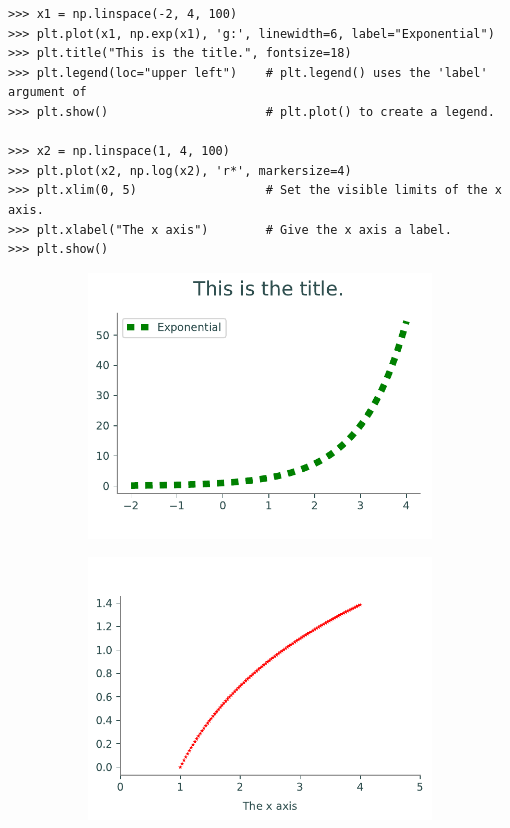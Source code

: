 \begin{lstlisting}
>>> x1 = np.linspace(-2, 4, 100)
>>> plt.plot(x1, np.exp(x1), 'g:', linewidth=6, label="Exponential")
>>> plt.title("This is the title.", fontsize=18)
>>> plt.legend(loc="upper left")    # plt.legend() uses the 'label' argument of
>>> plt.show()                      # plt.plot() to create a legend.

>>> x2 = np.linspace(1, 4, 100)
>>> plt.plot(x2, np.log(x2), 'r*', markersize=4)
>>> plt.xlim(0, 5)                  # Set the visible limits of the x axis.
>>> plt.xlabel("The x axis")        # Give the x axis a label.
>>> plt.show()
\end{lstlisting}
%
\begin{figure}[H] %
\captionsetup[subfigure]{justification=centering}
\centering
\begin{subfigure}{.49\textwidth}
    \centering
    \includegraphics[width=\linewidth]{figures/custom1.pdf}
    \label{fig:custom1}
\end{subfigure}
%
\begin{subfigure}{.49\textwidth}
    \centering
    \includegraphics[width=\linewidth]{figures/custom2.pdf}
    \label{fig:custom2}
\end{subfigure}
\label{fig:custom}
\end{figure}
